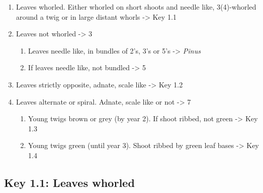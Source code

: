 \documentclass[openany]{book}
\providecommand{\tightlist}{%
  \setlength{\itemsep}{0pt}\setlength{\parskip}{0pt}}
\begin{document}
\begin{enumerate}
\def\labelenumi{\arabic{enumi}.}
\tightlist
\item
  Leaves whorled. Either whorled on short shoots and needle like,
  3(4)-whorled around a twig or in large distant whorls -\textgreater{}
  Key 1.1
\item
  Leaves not whorled -\textgreater{} 3

  \begin{enumerate}
  \def\labelenumii{\arabic{enumii}.}
  \setcounter{enumii}{2}
  \tightlist
  \item
    Leaves needle like, in bundles of 2's, 3's or 5's -\textgreater{}
    \emph{Pinus}
  \item
    If leaves needle like, not bundled -\textgreater{} 5
  \end{enumerate}
\item
  Leaves strictly opposite, adnate, scale like -\textgreater{} Key 1.2
\item
  Leaves alternate or spiral. Adnate, scale like or not -\textgreater{}
  7

  \begin{enumerate}
  \def\labelenumii{\arabic{enumii}.}
  \setcounter{enumii}{6}
  \tightlist
  \item
    Young twigs brown or grey (by year 2). If shoot ribbed, not green
    -\textgreater{} Key 1.3
  \item
    Young twigs green (until year 3). Shoot ribbed by green leaf bases
    -\textgreater{} Key 1.4
  \end{enumerate}
\end{enumerate}

\hypertarget{key-1.1-leaves-whorled-1}{%
\subsection{Key 1.1: Leaves whorled}\label{key-1.1-leaves-whorled-1}}
\end{document}

